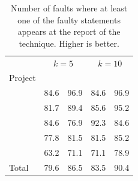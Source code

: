 \documentclass{article}
\begin{document}
%

\begin{table}[h]
	\small
	\setlength{\tabcolsep}{3pt}
	\centering
\begin{tabular}{l|rr|rr}
		 \toprule
       & \multicolumn{2}{c|}{$k=5$} & \multicolumn{2}{c}{$k=10$} \\
		 Project        &   \sfl{}   & \comb &   \sfl{}   & \comb\\
		\midrule
		 \lang{}         &   84.6   & 96.9 & 84.6 & 96.9  \\
		\cmath{}           & 81.7 & 89.4 & 85.6 & 95.2 \\
		\chart{}           & {\cellcolor{Gray} 84.6} & {\cellcolor{Gray}76.9} & {\cellcolor{Gray}92.3} & {\cellcolor{Gray}84.6}\\
		\jtime{}           & 77.8 & 81.5 & 81.5 & 85.2\\
		\mockito{}           & 63.2 & 71.1 & 71.1 & 78.9\\   \midrule
		Total         & 79.6 & 86.5 & 83.5 & 90.4\\
		\bottomrule
	\end{tabular}
  \caption {Number of faults where at least one of the faulty
    statements appears at the report of the technique. Higher is better.}
  \label{table:fsws}
\end{table}
\end{document}
